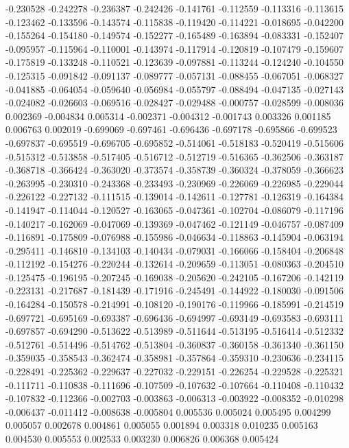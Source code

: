 -0.230528
-0.242278
-0.236387
-0.242426
-0.141761
-0.112559
-0.113316
-0.113615
-0.123462
-0.133596
-0.143574
-0.115838
-0.119420
-0.114221
-0.018695
-0.042200
-0.155264
-0.154180
-0.149574
-0.152277
-0.165489
-0.163894
-0.083331
-0.152407
-0.095957
-0.115964
-0.110001
-0.143974
-0.117914
-0.120819
-0.107479
-0.159607
-0.175819
-0.133248
-0.110521
-0.123639
-0.097881
-0.113244
-0.124240
-0.104550
-0.125315
-0.091842
-0.091137
-0.089777
-0.057131
-0.088455
-0.067051
-0.068327
-0.041885
-0.064054
-0.059640
-0.056984
-0.055797
-0.088494
-0.047135
-0.027143
-0.024082
-0.026603
-0.069516
-0.028427
-0.029488
-0.000757
-0.028599
-0.008036
0.002369
-0.004834
0.005314
-0.002371
-0.004312
-0.001743
0.003326
0.001185
0.006763
0.002019
-0.699069
-0.697461
-0.696436
-0.697178
-0.695866
-0.699523
-0.697837
-0.695519
-0.696705
-0.695852
-0.514061
-0.518183
-0.520419
-0.515606
-0.515312
-0.513858
-0.517405
-0.516712
-0.512719
-0.516365
-0.362506
-0.363187
-0.368718
-0.366424
-0.363020
-0.373574
-0.358739
-0.360324
-0.378059
-0.366623
-0.263995
-0.230310
-0.243368
-0.233493
-0.230969
-0.226069
-0.226985
-0.229044
-0.226122
-0.227132
-0.111515
-0.139014
-0.142611
-0.127781
-0.126319
-0.164384
-0.141947
-0.114044
-0.120527
-0.163065
-0.047361
-0.102704
-0.086079
-0.117196
-0.140217
-0.162069
-0.047069
-0.139369
-0.047462
-0.121149
-0.046757
-0.087409
-0.116891
-0.175809
-0.076988
-0.155986
-0.046634
-0.118863
-0.145904
-0.063194
-0.295411
-0.146810
-0.134103
-0.140434
-0.079031
-0.166066
-0.158404
-0.206848
-0.112192
-0.154276
-0.220244
-0.132614
-0.209659
-0.113051
-0.080363
-0.204510
-0.125475
-0.196195
-0.207245
-0.169038
-0.205620
-0.242105
-0.167206
-0.142119
-0.223131
-0.217687
-0.181439
-0.171916
-0.245491
-0.144922
-0.180030
-0.091506
-0.164284
-0.150578
-0.214991
-0.108120
-0.190176
-0.119966
-0.185991
-0.214519
-0.697721
-0.695169
-0.693387
-0.696436
-0.694997
-0.693149
-0.693583
-0.693111
-0.697857
-0.694290
-0.513622
-0.513989
-0.511644
-0.513195
-0.516414
-0.512332
-0.512761
-0.514496
-0.514762
-0.513804
-0.360837
-0.360158
-0.361340
-0.361150
-0.359035
-0.358543
-0.362474
-0.358981
-0.357864
-0.359310
-0.230636
-0.234115
-0.228491
-0.225362
-0.229637
-0.227032
-0.229151
-0.226254
-0.229528
-0.225321
-0.111711
-0.110838
-0.111696
-0.107509
-0.107632
-0.107664
-0.110408
-0.110432
-0.107832
-0.112366
-0.002703
-0.003863
-0.006313
-0.003922
-0.008352
-0.010298
-0.006437
-0.011412
-0.008638
-0.005804
0.005536
0.005024
0.005495
0.004299
0.005057
0.002678
0.004861
0.005055
0.001894
0.003318
0.010235
0.005163
0.004530
0.005553
0.002533
0.003230
0.006826
0.006368
0.005424

